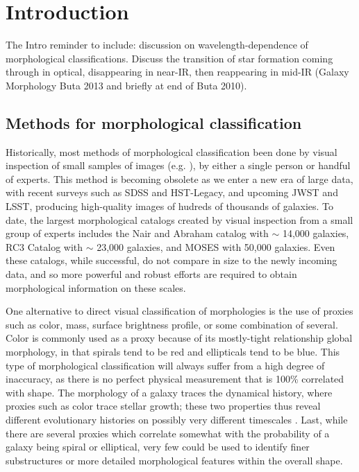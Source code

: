 \chapter{Introduction}
\label{chap:intro}

The Intro
reminder to include: discussion on wavelength-dependence of morphological classifications. Discuss the transition of star formation coming through in optical, disappearing in near-IR, then reappearing in mid-IR (Galaxy Morphology Buta 2013 and briefly at end of Buta 2010).  

\section{Methods for morphological classification}

Historically, most methods of morphological classification been done by visual inspection of small samples of images (e.g. \citet{Hubble1926,Sandage1961,DeVaucouleurs1963,Block1994,Eskridge2002,Buta2010}), by either a single person or handful of experts. This method is becoming obsolete as we enter a new era of large data, with recent surveys such as SDSS and HST-Legacy, and upcoming JWST and LSST, producing high-quality images of hudreds of thousands of galaxies. To date, the largest morphological catalogs created by visual inspection from a small group of experts includes the Nair and Abraham catalog \citep{Nair2010} with $\sim$ 14,000 galaxies, RC3 Catalog \citep{RC31991} with $\sim$ 23,000 galaxies, and MOSES \citep{Schawinski2007} with 50,000 galaxies. Even these catalogs, while successful, do not compare in size to the newly incoming data, and so more powerful and robust efforts are required to obtain morphological information on these scales.

One alternative to direct visual classification of morphologies is the use of proxies such as color, mass, surface brightness profile, or some combination of several. Color is commonly used as a proxy because of its mostly-tight relationship global morphology, in that spirals tend to be red and ellipticals tend to be blue. This type of morphological classification will always suffer from a high degree of inaccuracy, as there is no perfect physical measurement that is 100\% correlated with shape. The morphology of a galaxy traces the dynamical history, where proxies such as color trace stellar growth; these two properties thus reveal different evolutionary histories on possibly very different timescales \citet{Fortson2011}. Last, while there are several proxies which correlate somewhat with the probability of a galaxy being spiral or elliptical, very few could be used to identify finer substructures or more detailed morphological features within the overall shape. 


